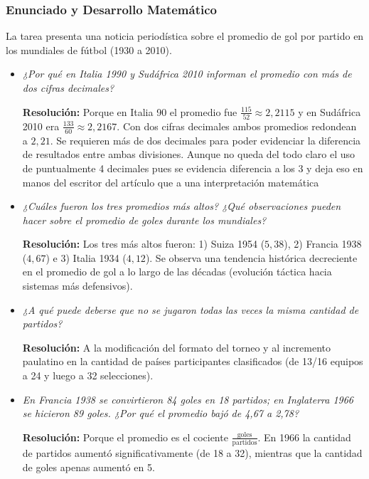 \documentclass[11pt,a4paper]{article}
\begin{document}
\subsubsection{Enunciado y Desarrollo Matemático}
La tarea presenta una noticia periodística sobre el promedio de gol por partido en los mundiales de fútbol (1930 a 2010).
\begin{itemize}
    \item[a)] \textit{¿Por qué en Italia 1990 y Sudáfrica 2010 informan el promedio con más de dos cifras decimales?}
    
    \textbf{Resolución:} Porque en Italia 90 el promedio fue $\frac{115}{52} \approx 2{,}2115$ y en Sudáfrica 2010 era $\frac{133}{60} \approx 2{,}2167$. Con dos cifras decimales ambos promedios redondean a $2{,}21$. Se requieren más de dos decimales para poder evidenciar la diferencia de resultados entre ambas divisiones. Aunque no queda del todo claro el uso de puntualmente 4 decimales pues se evidencia diferencia a los 3 y deja eso en manos del escritor del artículo que a una interpretación matemática
    
    \item[b)] \textit{¿Cuáles fueron los tres promedios más altos? ¿Qué observaciones pueden hacer sobre el promedio de goles durante los mundiales?}
    
    \textbf{Resolución:} Los tres más altos fueron: 1) Suiza 1954 ($5{,}38$), 2) Francia 1938 ($4{,}67$) e 3) Italia 1934 ($4{,}12$). Se observa una tendencia histórica decreciente en el promedio de gol a lo largo de las décadas (evolución táctica hacia sistemas más defensivos).
    
    \item[c)] \textit{¿A qué puede deberse que no se jugaron todas las veces la misma cantidad de partidos?}
    
    \textbf{Resolución:} A la modificación del formato del torneo y al incremento paulatino en la cantidad de países participantes clasificados (de 13/16 equipos a 24 y luego a 32 selecciones).
    
    \item[d)] \textit{En Francia 1938 se convirtieron 84 goles en 18 partidos; en Inglaterra 1966 se hicieron 89 goles. ¿Por qué el promedio bajó de 4,67 a 2,78?}
    
    \textbf{Resolución:} Porque el promedio es el cociente $\frac{\text{goles}}{\text{partidos}}$. En 1966 la cantidad de partidos aumentó significativamente (de 18 a 32), mientras que la cantidad de goles apenas aumentó en 5.
\end{itemize}
\end{document}
